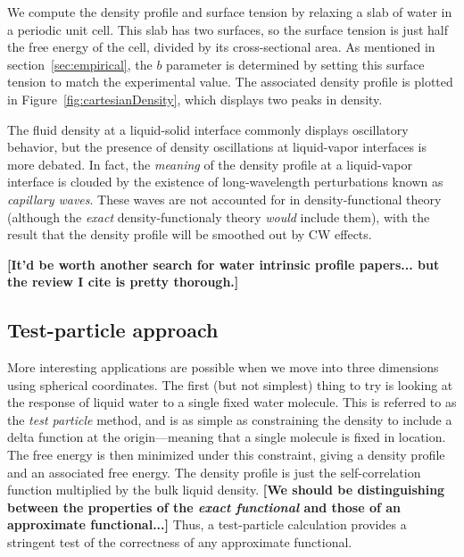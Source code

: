 \documentclass[letterpaper,twocolumn,amsmath,amssymb,prb]{revtex4}
\newcommand{\red}[1]{{\bf \color{red} #1}}
\newcommand{\fixme}[1]{\red{[#1]}}
\begin{document}
We compute the density profile and surface tension by relaxing a slab
of water in a periodic unit cell.  This slab has two surfaces, so the
surface tension is just half the free energy of the cell, divided by
its cross-sectional area.  As mentioned in
section~\ref{sec:empirical}, the $b$ parameter is determined by
setting this surface tension to match the experimental value.  The
associated density profile is plotted in
Figure~\ref{fig:cartesianDensity}, which displays two peaks in
density.

The fluid density at a liquid-solid interface commonly displays
oscillatory behavior, but the presence of density oscillations at
liquid-vapor interfaces is more debated\cite{penfold2001structure}.
In fact, the \emph{meaning} of the density profile at a liquid-vapor
interface is clouded by the existence of long-wavelength perturbations
known as \emph{capillary waves}.  These waves are not accounted for in
density-functional theory (although the \emph{exact}
density-functionaly theory \emph{would} include them), with the result
that the density profile will be smoothed out by CW effects.

\fixme{It'd be worth another search for water intrinsic profile
  papers... but the review I cite is pretty thorough.}

\subsection{Test-particle approach}

More interesting applications are possible when we move into three
dimensions using spherical coordinates.  The first (but not simplest)
thing to try is looking at the response of liquid water to a single
fixed water molecule.  This is referred to as the \emph{test particle}
method\cite{FIXME}, and is as simple as constraining the density to
include a delta function at the origin---meaning that a single
molecule is fixed in location.  The free energy is then minimized
under this constraint, giving a density profile and an associated free
energy.  The density profile is just the self-correlation function
multiplied by the bulk liquid density.  \fixme{We should be
  distinguishing between the properties of the \emph{exact functional}
  and those of an approximate functional...}  Thus, a test-particle
calculation provides a stringent test of the correctness of any
approximate functional.
\end{document}

